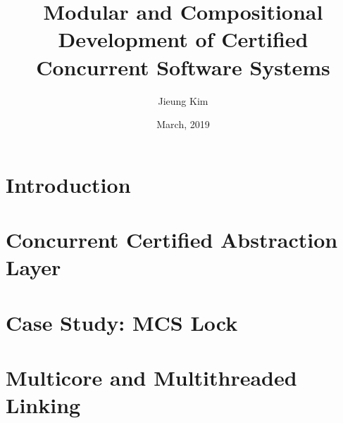 \documentclass[letterpaper,11pt]{yalephd}
\begin{document}
\title{Modular and Compositional Development of Certified Concurrent Software Systems}
\author{Jieung Kim}
\date{March, 2019} 

\frontmatter

\begin{abstract} 

\end{abstract}


\maketitle
{} %



\tableofcontents
\listoffigures %
\listoftables %


\mainmatter

\chapter{Introduction}
\label{chapter:introduction}
 

\chapter{Concurrent Certified Abstraction Layer}
\label{chapter:ccal}
%
%
%
%
%
%  
% 
%    
%
%


\chapter{Case Study: MCS Lock}
\label{chapter:mcs-lock}

%


%
%
%
%
%
%



\chapter{Multicore and Multithreaded Linking}
\label{chapter:linking}
\end{document}
